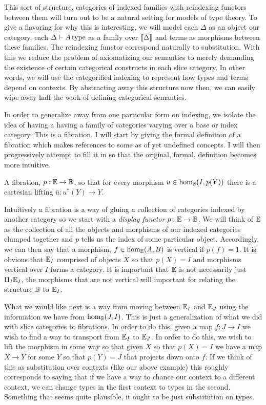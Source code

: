 This sort of structure, categories of indexed families with reindexing
functors between them will turn out to be a natural setting for models
of type theory. To give a flavoring for why this is interesting, we
will model each $\Delta$ as an object our category, each
$\Delta \vdash A\,\mathrm{type}$ as a family over $\llbracket \Delta \rrbracket$ and
terms as morphisms between these families. The reindexing functor
correspond naturally to substitution. With this we reduce the problem
of axiomatizing our semantics to merely demanding the existence of
certain categorical constructs in each slice category. In other words,
we will use the categorified indexing to represent how types and terms
depend on contexts. By abstracting away this structure now then, we
can easily wipe away half the work of defining categorical semantics.

In order to generalize away from one particular form on indexing, we
isolate the idea of having a having a family of categories varying
over a base or index category. This is a fibration. I will start by
giving the formal definition of a fibration which makes references to
some as of yet undefined concepts. I will then progressively attempt
to fill it in so that the original, formal, definition becomes more
intuitive.
\begin{defn}\label{defn:fibrations:fibration}
  A fibration, $p : \mathbb{E} \to \mathbb{B}$, so that for every morphism
  $u \in \hom_{\mathbb{B}}(I, p(Y))$ there is a cartesian lifting
  $\bar{u} : u^*(Y) \to Y$.
\end{defn}
Intuitively a fibration is a way of gluing a collection of categories
indexed by another category so we start with a \emph{display functor}
$p : \mathbb{E} \to \mathbb{B}$. We will think of $\mathbb{E}$ as the collection of
all the objects and morphisms of our indexed categories clumped
together and $p$ tells us the index of some particular
object. Accordingly, we can then say that a morphism,
$f \in \hom_{\mathbb{E}}(A, B)$ is vertical if $p(f) = 1$. It is obvious
that $\mathbb{E}_I$ comprised of objects $X$ so that $p(X) = I$ and
morphisms vertical over $I$ forms a category. It is important that
$\mathbb{E}$ is not necessarily just $\amalg_I \mathbb{E}_I$, the morphisms that
are not vertical will important for relating the structure $\mathbb{B}$ to
$\mathbb{E}_I$.

What we would like next is a way from moving between $\mathbb{E}_I$ and
$\mathbb{E}_J$ using the information we have from $\hom_{\mathbb{B}}(J, I)$. This
is just a generalization of what we did with slice categories to
fibrations. In order to do this, given a map $f : J \to I$ we wish to
find a way to transport from $\mathbb{E}_I$ to $\mathbb{E}_J$. In order to do
this, we wish to lift the morphism in some way so that given $X$ so
that $p(X) = I$ we have a map $X \to Y$ for some $Y$ so that
$p(Y) = J$ that projects down onto $f$. If we think of this as
substitution over contexts (like our above example) this roughly
corresponds to saying that if we have a way to chance our context to a
different context, we can change types in the first context to types
in the second. Something that seems quite plausible, it ought to be
just substitution on types.

